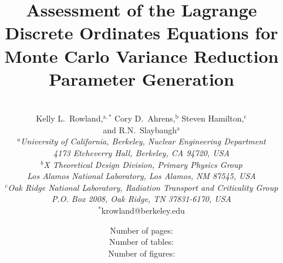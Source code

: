 \documentclass{article} %
\begin{document}

\title{Assessment of the Lagrange Discrete Ordinates Equations for Monte Carlo Variance
Reduction Parameter Generation} %

\author{
\vspace{20mm}
\\Kelly L.\ Rowland,$^{\text{a},\ast}$  Cory D.\ Ahrens,$^\text{b}$ Steven Hamilton,$^\text{c}$ 
\\and R.N.\ Slaybaugh$^{\text{a}}$\\[4pt] 
\textit{$^a$University of California, Berkeley, Nuclear Engineering Department}\\[-10pt]
\textit{4173 Etcheverry Hall, Berkeley, CA 94720, USA} \\[-5pt]
\textit{$^b$X Theoretical Design Division, Primary Physics Group}\\[-10pt]
\textit{Los Alamos National Laboratory, Los Alamos, NM 87545, USA}\\[-5pt]
\textit{$^c$Oak Ridge National Laboratory, Radiation Transport and Criticality Group} \\ [-10pt]
\textit{P.O. Box 2008, Oak Ridge, TN 37831-6170, USA} \\ [-2pt]
{$^\ast$krowland@berkeley.edu}}       %

\date{
\vspace{40mm}
Number of pages: \pageref{LastPage} \\  
Number of tables: \totaltables \\
Number of figures: \totalfigures \\}

\maketitle

\pagebreak
\end{document}
